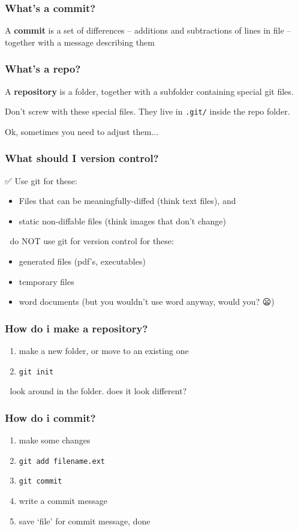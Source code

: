 \documentclass[14pt,aspectratio=1610]{beamer} %
\newcommand{\fframe}[2]{
   \begin{frame}
\frametitle{#1}
#2
\end{frame}
}
\begin{document}
\fframe{What's a commit?}{

\begin{definition}
A {\bf commit} is a set of differences -- additions and subtractions of lines in file -- together with a message describing them
\end{definition}
}

\fframe{What's a repo?}
{  
\begin{definition}
A {\bf repository} is a folder, together with a subfolder containing special git files. 
\end{definition}

 Don't screw with these special files.  They live in {\tt .git/} inside the repo folder.  

\vfill 

 \tiny Ok, sometimes you need to adjust them...
}
                    
\fframe{What should I version control?}
{
	✅ Use git for these: 
	\begin{itemize}
		\item Files that can be meaningfully-diffed (think text files), and 
		\item static non-diffable files (think images that don't change)
	\end{itemize}

\vspace{\baselineskip}

	🚫 do NOT use git for version control for these:
	\begin{itemize}
		\item generated files (pdf's, executables)
		\item temporary files
		\item word documents (but you wouldn't use word anyway, would you? 😦)
	\end{itemize}
}






\fframe{How do i make a repository?}
{
	\begin{enumerate}
		\item make a new folder, or move to an existing one
		\item {\tt git init}
	\end{enumerate}

\vspace{\baselineskip}

👀	look around in the folder.  does it look different?
}


\fframe{How do i commit?}
{
	\begin{enumerate}
		\item make some changes
		\item {\tt git add filename.ext}
		\item {\tt git commit}
		\item write a commit message
		\item save `file' for commit message, done
	\end{enumerate}
}
\end{document}
